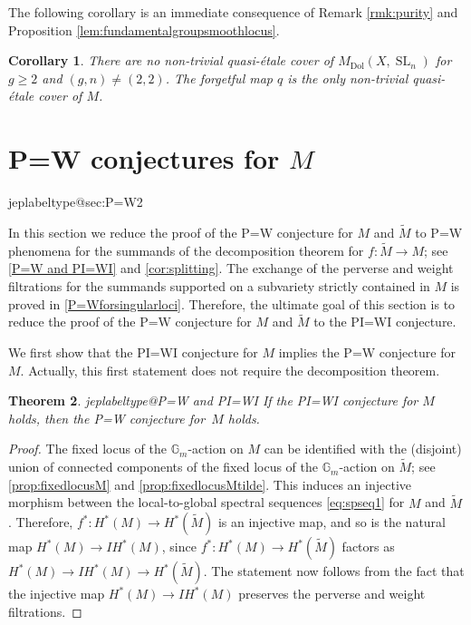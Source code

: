 \documentclass[11pt]{article}
\makeatletter
\newcommand{\IH}{\mathit{IH}}
\newtheorem{thm}{Theorem}[section]
\newtheorem{cor}[thm]{Corollary}
\theoremstyle{definition}
\newcommand{\Gm}{\mathbb{G}_m}
\newcommand{\Sl}{\operatorname{SL}}
\newcommand{\MDolSl}{{M}_{\mathrm{Dol}}(X, \Sl_n)}
\renewcommand{\label}[1]{\ifcsname jeplabeltype@#1\endcsname
\edef\jeplabeltype{\csname jeplabeltype@#1\endcsname}\expandafter\jeporiginalLabel\expandafter[\jeplabeltype]{#1}\else\jeporiginalLabel{#1}\fi}}
\makeatother
\begin{document}
The following corollary is an immediate consequence of Remark \ref{rmk:purity} and Proposition \ref{lem:fundamentalgroupsmoothlocus}.

\begin{cor}
There are no non-trivial quasi-étale cover of $\MDolSl$ for $g \geq 2$ and $(g,n) \neq (2,2)$. The forgetful map $q$ is the only non-trivial quasi-étale cover of $M$.
\end{cor}
\section{P=W conjectures for \texorpdfstring{$M$}{M}}\label{sec:P=W2}

In this section we
reduce the proof of the P=W conjecture for $M$ and $\widetilde{M}$ to P=W phenomena for the summands of the decomposition theorem for $f\colon \widetilde{M} \to M$; see \cref{P=W and PI=WI} and \cref{cor:splitting}. The exchange of the perverse and weight filtrations for the summands supported on a subvariety strictly contained in $M$ is proved in \cref{P=Wforsingularloci}. Therefore, the ultimate goal of this section is to reduce the proof of the P=W conjecture for $M$ and $\widetilde{M}$ to the PI=WI conjecture.

We first show that the PI=WI conjecture for $M$ implies the P=W conjecture for~$M$. Actually, this first statement does not require the decomposition theorem.

\begin{thm}\label{P=W and PI=WI}
If the PI=WI conjecture for $M$ holds, then the P=W conjecture for~$M$ holds.
\end{thm}
\begin{proof}
The fixed locus of the $\Gm$\nobreakdash-action on $M$ can be identified with the (disjoint) union of connected components of the fixed locus of the $\Gm$\nobreakdash-action on $\widetilde{M}$; see \cref{prop:fixedlocusM} and \cref{prop:fixedlocusMtilde}. This induces an injective morphism between the local-to-global spectral sequences \eqref{eq:spseq1} for $M$ and $\widetilde{M}$. Therefore, $f^*\colon H^*(M) \to H^*(\widetilde{M})$ is an injective map, and so is the natural map $H^*(M) \to \IH^*(M)$, since $f^*\colon H^*(M) \to H^*(\widetilde{M})$ factors as $H^*(M) \to \IH^*(M) \to H^*(\widetilde{M})$. The statement now follows from the fact that the injective map $H^*(M) \to \IH^*(M)$ preserves the perverse and weight filtrations.
\end{proof}
\end{document}
